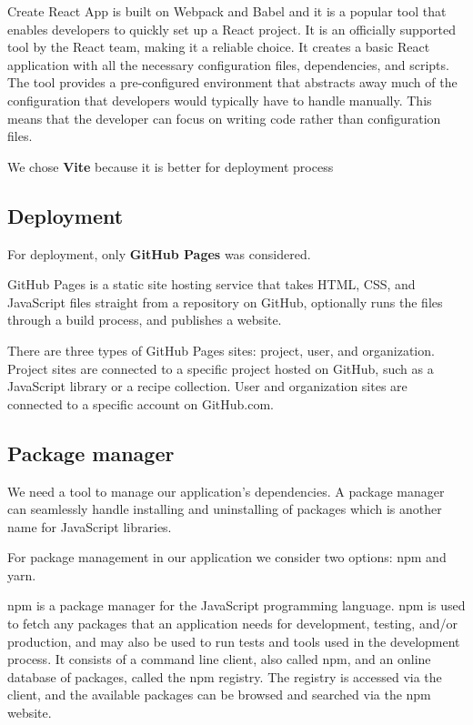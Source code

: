   Create React App is built on Webpack and Babel and it is a popular tool that enables developers to quickly set up a React project. It is an officially supported tool by the React team, making it a reliable choice. It creates a basic React application with all the necessary configuration files, dependencies, and scripts. The tool provides a pre-configured environment that abstracts away much of the configuration that developers would typically have to handle manually. This means that the developer can focus on writing code rather than configuration files.

  We chose \textbf{Vite} because it is better for deployment process


\subsection*{Deployment}
  For deployment, only \textbf{GitHub Pages} was considered.

  GitHub Pages is a static site hosting service that takes HTML, CSS, and JavaScript files straight from a repository on GitHub, optionally runs the files through a build process, and publishes a website.

  There are three types of GitHub Pages sites: project, user, and organization. Project sites are connected to a specific project hosted on GitHub, such as a JavaScript library or a recipe collection. User and organization sites are connected to a specific account on GitHub.com.


\subsection*{Package manager}
  We need a tool to manage our application's dependencies.
  A package manager can seamlessly handle installing and uninstalling of packages which is another name for JavaScript libraries.

  For package management in our application we consider two options: npm and yarn.

  npm is a package manager for the JavaScript programming language.
  npm is used to fetch any packages that an application needs for development, testing, and/or production, and may also be used to run tests and tools used in the development process.
  It consists of a command line client, also called npm, and an online database of packages, called the npm registry. 
  The registry is accessed via the client, and the available packages can be browsed and searched via the npm website.

